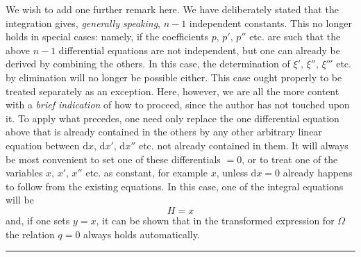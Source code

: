 We wish to add one further remark here. We have deliberately stated that the integration gives, \emph{generally speaking}, \(n-1\) independent constants. This no longer holds in special cases: namely, if the coefficients \(p,\,p',\,p''\) etc. are such that the above \(n-1\) differential equations are not independent, but one can already be derived by combining the others. In this case, the determination of \(\xi',\,\xi'',\,\xi'''\) etc. by elimination will no longer be possible either. This case ought properly to be treated separately as an exception. Here, however, we are all the more content with a \emph{brief indication} of how to proceed, since the author has not touched upon it. To apply what precedes, one need only replace the one differential equation above that is already contained in the others by any other arbitrary linear equation between \(\mathrm{d}x,\,\mathrm{d}x',\,\mathrm{d}x''\) etc. not already contained in them. It will always be most convenient to set one of these differentials \(=0\), or to treat one of the variables \(x,\,x',\,x''\) etc.
 as constant, for example \(x\), unless \(\mathrm{d}x=0\) already happens to follow from the existing equations. In this case, one of the integral equations will be
\[
H=x
\]
and, if one sets \(y=x\), it can be shown that in the transformed expression for \(\Omega\) the relation \(q=0\) always holds automatically.

\begin{center}\rule{0.25\linewidth}{0.3pt}\end{center}


